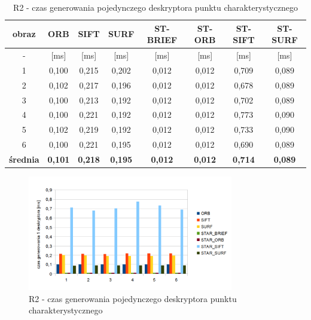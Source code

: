 \begin{table}[htbp]
  \centering
  \caption{R2 - czas generowania pojedynczego deskryptora punktu charakterystycznego}
    \begin{tabular}{|c|c|c|c|c|c|c|c|}\hline

    obraz & \textbf{ORB} & \textbf{SIFT} & \textbf{SURF} & \textbf{ST-BRIEF} & \textbf{ST-ORB} & \textbf{ST-SIFT} & \textbf{ST-SURF} \\\hline

    - & [ms] & [ms] & [ms] & [ms] & [ms] & [ms] & [ms] \\\hline
    1 & 0,100 & 0,215 & 0,202 & 0,012 & 0,012 & 0,709 & 0,089 \\
    2 & 0,102 & 0,217 & 0,196 & 0,012 & 0,012 & 0,678 & 0,089 \\
    3 & 0,100 & 0,213 & 0,192 & 0,012 & 0,012 & 0,702 & 0,089 \\
    4 & 0,100 & 0,221 & 0,192 & 0,012 & 0,012 & 0,773 & 0,090 \\
    5 & 0,102 & 0,219 & 0,192 & 0,012 & 0,012 & 0,733 & 0,090 \\
    6 & 0,100 & 0,221 & 0,195 & 0,012 & 0,012 & 0,690 & 0,089 \\\hline
    \textbf{średnia} & \textbf{0,101} & \textbf{0,218} & \textbf{0,195} & \textbf{0,012} & \textbf{0,012} & \textbf{0,714} & \textbf{0,089} \\\hline
    
    \end{tabular}%
  \label{tab:r2_f3}%
\end{table}%


\begin{figure}
\centering
\includegraphics[width=0.8\textwidth]{pict/slowik/r2/f3.png}
\caption{R2 - czas generowania pojedynczego deskryptora punktu charakterystycznego}
\label{fig:r2_f3}
\end{figure}


